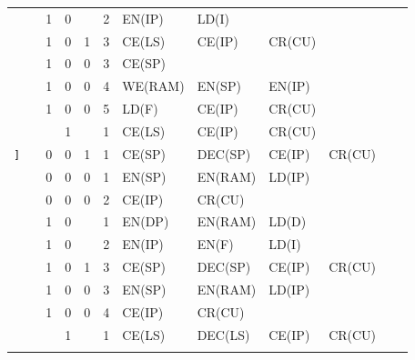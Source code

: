 \begin{table}[H]
{\begin{tabular} {c|cccc|c|llllll}
      \rowcolor{Gray}
                 &   & 1 & 0     &      & 2     & EN(IP)  & LD(I) &           &        &       &          \\
      \rowcolor{Gray}
                 &   & 1 & 0     & 1    & 3     & CE(LS)  & CE(IP) & CR(CU)   &        &       &          \\
      \rowcolor{White}
                 &   & 1 & 0     & 0    & 3     & CE(SP)  &        &          &        &       &          \\
      \rowcolor{White}
                 &   & 1 & 0     & 0    & 4     & WE(RAM) & EN(SP) & EN(IP)   &        &       &          \\
      \rowcolor{White}
                 &   & 1 & 0     & 0    & 5     & LD(F)   & CE(IP) & CR(CU)   &        &       &          \\ 
      \rowcolor{Gray}
                &   &   & 1     &      & 1      & CE(LS)  & CE(IP) & CR(CU)   &        &       &          \\ \hline
      \rowcolor{White}
      \texttt{]} &   & 0 & 0     & 1    & 1     & CE(SP)  & DEC(SP) & CE(IP)  & CR(CU) &       &          \\
      \rowcolor{Gray}
                 &   & 0 & 0     & 0    & 1     & EN(SP)  & EN(RAM) & LD(IP)  &        &       &          \\
      \rowcolor{Gray}
                 &   & 0 & 0     & 0    & 2     & CE(IP)  & CR(CU)  &         &        &       &          \\
      \rowcolor{White}
                 &   & 1 & 0     &      & 1     & EN(DP)  & EN(RAM) & LD(D)   &        &       &          \\
      \rowcolor{White}
                 &   & 1 & 0     &      & 2     & EN(IP)  & EN(F)   & LD(I)   &        &       &          \\
      \rowcolor{White}
                 &   & 1 & 0     & 1    & 3     & CE(SP)  & DEC(SP) & CE(IP)  & CR(CU) &       &          \\
      \rowcolor{Gray}
                 &   & 1 & 0     & 0    & 3     & EN(SP)  & EN(RAM) & LD(IP)  &        &       &          \\
      \rowcolor{Gray}
                 &   & 1 & 0     & 0    & 4     & CE(IP)  & CR(CU)  &         &        &       &          \\
      \rowcolor{White}
                 &   &   & 1     &      & 1     & CE(LS)  & DEC(LS) & CE(IP)  & CR(CU) &       &          \\ \hline
      \rowcolor{Gray}

\end{tabular}}
\end{table}
